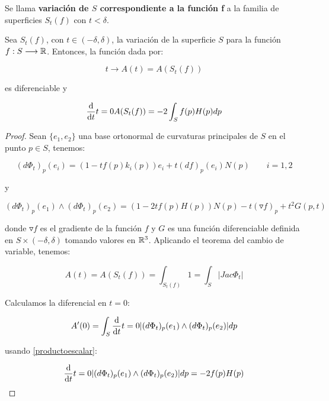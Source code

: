 Se llama \textbf{variación de $S$ correspondiente a la función f} a la familia de superficies $S_t(f)$ con $t < \delta$.

\begin{remark}
Sea $S_t(f)$, con $t \in (-\delta, \delta)$, la variación de la superficie $S$ para la función $f: S \longrightarrow \mathbb{R}$. Entonces, la función dada por:

\begin{equation*}
    t \longrightarrow A(t) = A(S_t(f))
\end{equation*}

es diferenciable y

\begin{equation}\label{variacionarea}
    \diff{}{t}{t=0} A(S_t(f)) = -2 \int_S f(p)H(p) dp
\end{equation}
\end{remark}
\begin{proof}
Sean $\{e_1, e_2\}$ una base ortonormal de curvaturas principales de $S$ en el punto $p \in S$, tenemos:

\begin{equation*}
    (d\Phi_t)_p(e_i) = (1 - tf(p)k_i(p))e_i + t(df)_p(e_i)N(p) \qquad i=1,2
\end{equation*}

y

\begin{equation}\label{productoescalar}
    (d\Phi_t)_p(e_1) \wedge (d\Phi_t)_p(e_2) = (1 - 2tf(p)H(p))N(p) - t(\triangledown f)_p + t^2G(p,t)
\end{equation}

donde $\triangledown f$ es el gradiente de la función $f$ y $G$ es una función diferenciable definida en $S \times (-\delta, \delta)$ tomando valores en $\mathbb{R}^3$. Aplicando el teorema del cambio de variable, tenemos:

\begin{equation*}
    A(t) = A(S_t(f)) = \int_{S_t(f)} 1 = \int_S |Jac \Phi_t|
\end{equation*}

Calculamos la diferencial en $t=0$:

\begin{equation*}
    A'(0) = \int_S \diff{}{t}{t=0} |(d\Phi_t)_p(e_1) \wedge (d\Phi_t)_p(e_2)|dp 
\end{equation*}

usando \autoref{productoescalar}:

\begin{equation*}
    \diff{}{t}{t=0} |(d\Phi_t)_p(e_1) \wedge (d\Phi_t)_p(e_2)|dp = -2f(p)H(p)
\end{equation*}
\end{proof}


